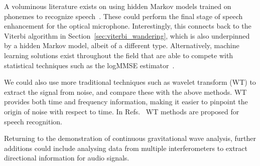 \documentclass[paper-main.tex]{subfiles}
\begin{document}
A voluminous literature exists on using hidden Markov models trained on phonemes to recognize speech~\cite{HMM_english}. These could perform the final stage of speech enhancement for the optical microphone. Interestingly, this connects back to the Viterbi algorithm in Section~\ref{sec:viterbi_wandering}, which is also underpinned by a hidden Markov model, albeit of a different type. Alternatively, machine learning solutions exist throughout the field that are able to compete with statistical techniques such as the logMMSE estimator~\cite{SEGAN}.


We could also use more traditional techniques such as wavelet transform (WT) \citep{nason1995stationary} to extract the signal from noise, and compare these with the above methods. WT provides both time and frequency information, making it easier to pinpoint the origin of noise with respect to time. In Refs.~\cite{tufekci2000feature,agbinya1996discrete} WT methods are proposed for speech recognition. 

Returning to the demonstration of continuous gravitational wave analysis, further additions could include analysing data from multiple interferometers to extract directional information for audio signals. 




\end{document}
